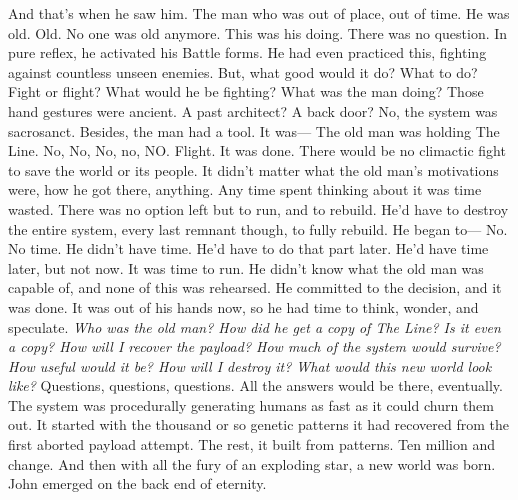 And that’s when he saw him. The man who was out of place, out of time.
\SomeVSpace
He was old.
\SomeVSpace
Old.
\SomeVSpace
No one was old anymore.
\SomeVSpace
This was his doing. There was no question. In pure reflex, he activated his Battle forms. He had even practiced this, fighting against countless unseen enemies. But, what good would it do? What to do? Fight or flight? What would he be fighting? What was the man doing? Those hand gestures were ancient. A past architect? A back door? No, the system was sacrosanct. Besides, the man had a tool. It was\mbox{---}
\SomeVSpace
The old man was holding The Line.
\SomeVSpace
No, No, No, no, NO.
\SomeVSpace
Flight. It was done. There would be no climactic fight to save the world or its people.  It didn’t matter what the old man’s motivations were, how he got there, anything.  Any time spent thinking about it was time wasted. There was no option left but to run, and to rebuild. He’d have to destroy the entire system, every last remnant though, to fully rebuild. He began to\mbox{---}
\SmallVSpace
No. No time.
\SmallVSpace
He didn’t have time. He’d have to do that part later. He’d have time later, but not now. It was time to run. He didn’t know what the old man was capable of, and none of this was rehearsed. He committed to the decision, and it was done. It was out of his hands now, so he had time to think, wonder, and speculate.
\SmallVSpace
\emph{Who was the old man? How did he get a copy of The Line? Is it even a copy? How will I recover the payload? How much of the system would survive? How useful would it be? How will I destroy it? What would this new world look like?}
\SmallVSpace
Questions, questions, questions. All the answers would be there, eventually.
\SmallVSpace
The system was procedurally generating humans as fast as it could churn them out. It started with the thousand or so genetic patterns it had recovered from the first aborted payload attempt. The rest, it built from patterns. Ten million and change.
\SmallVSpace
And then with all the fury of an exploding star, a new world was born.
\SmallVSpace
John emerged on the back end of eternity.